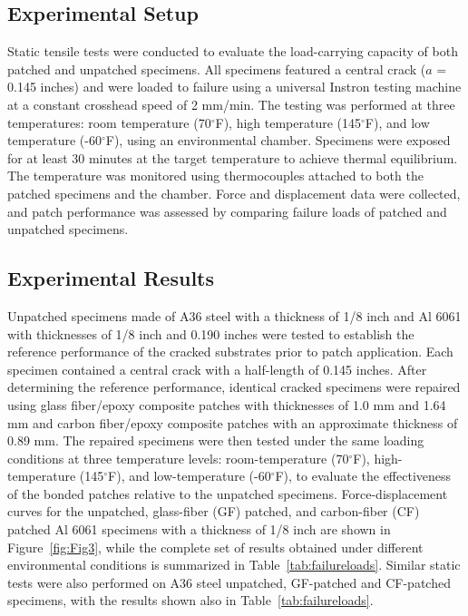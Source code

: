 \documentclass[journal,article,submit,pdftex,moreauthors]{Definitions/mdpi}
\begin{document}
\subsection{Experimental Setup}
Static tensile tests were conducted to evaluate the load-carrying capacity of both patched and unpatched specimens. All specimens featured a central crack ($a$ = 0.145 inches) and were loaded to failure using a universal Instron testing machine at a constant crosshead speed of 2 mm/min. The testing was performed at three temperatures: room temperature (70$^\circ$F), high temperature (145$^\circ$F), and low temperature (-60$^\circ$F), using an environmental chamber. Specimens were exposed for at least 30 minutes at the target temperature to achieve thermal equilibrium. The temperature was monitored using thermocouples attached to both the patched specimens and the chamber. Force and displacement data were collected, and patch performance was assessed by comparing failure loads of patched and unpatched specimens. 

\subsection{Experimental Results}
Unpatched specimens made of A36 steel with a thickness of 1/8 inch and Al 6061 with thicknesses of 1/8 inch and 0.190 inches were tested to establish the reference performance of the cracked substrates prior to patch application. Each specimen contained a central crack with a half-length of 0.145 inches. After determining the reference performance, identical cracked specimens were repaired using glass fiber/epoxy composite patches with thicknesses of 1.0 mm and 1.64 mm and carbon fiber/epoxy composite patches with an approximate thickness of 0.89 mm. The repaired specimens were then tested under the same loading conditions at three temperature levels: room-temperature (70$^\circ$F), high-temperature (145$^\circ$F), and low-temperature (-60$^\circ$F), to evaluate the effectiveness of the bonded patches relative to the unpatched specimens. Force-displacement curves for the unpatched, glass-fiber (GF) patched, and carbon-fiber (CF) patched Al 6061 specimens with a thickness of 1/8 inch are shown in Figure~\ref{fig:Fig3}, while the complete set of results obtained under different environmental conditions is summarized in Table~\ref{tab:failureloads}. Similar static tests were also performed on A36 steel unpatched, GF-patched and CF-patched specimens, with the results shown also in Table~\ref{tab:failureloads}.
\end{document}
